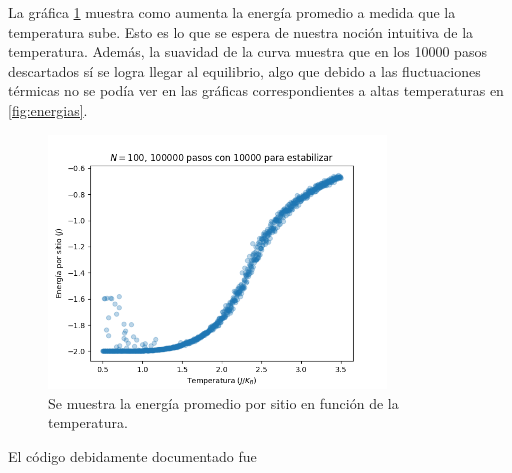 \documentclass{article}
\begin{document}
La gráfica \ref{fig:energia} muestra como aumenta la energía promedio a medida que la temperatura sube. Esto es lo que se espera de nuestra noción intuitiva de la temperatura. Además, la suavidad de la curva muestra que en los 10000 pasos descartados sí se logra llegar al equilibrio, algo que debido a las fluctuaciones térmicas no se podía ver en las gráficas correspondientes a altas temperaturas en  \ref{fig:energias}.

\begin{figure}
\centering
\includegraphics[width = 0.8\textwidth]{energia.png}
\caption{\label{fig:energia}Se muestra la energía promedio por sitio en función de la temperatura.}
\end{figure}

El código debidamente documentado fue

\end{document}
